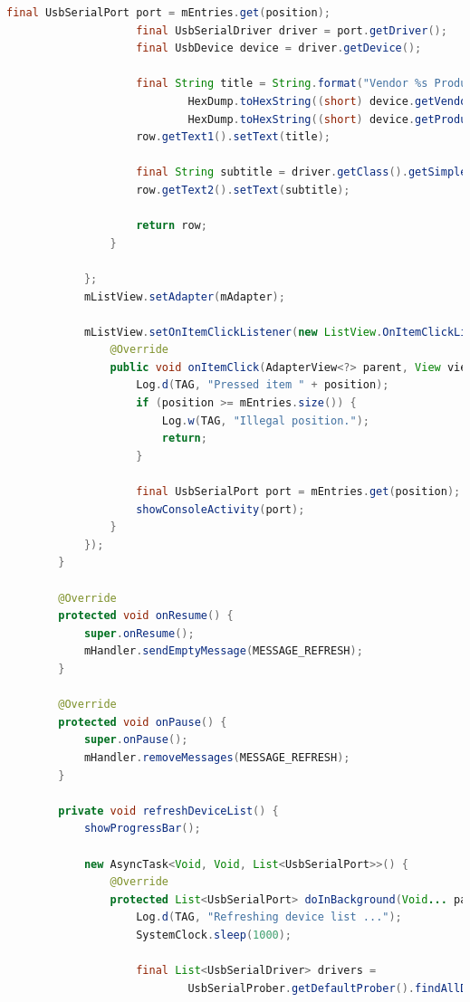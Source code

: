 \documentclass{article}
\numberwithin{figure}{section}
\numberwithin{equation}{section}
\begin{document}
{\begin{lstlisting}[language=Java,label=lst:devicelist,caption=DeviceListActivity.java]
                    final UsbSerialPort port = mEntries.get(position);
                    final UsbSerialDriver driver = port.getDriver();
                    final UsbDevice device = driver.getDevice();

                    final String title = String.format("Vendor %s Product %s",
                            HexDump.toHexString((short) device.getVendorId()),
                            HexDump.toHexString((short) device.getProductId()));
                    row.getText1().setText(title);

                    final String subtitle = driver.getClass().getSimpleName();
                    row.getText2().setText(subtitle);

                    return row;
                }

            };
            mListView.setAdapter(mAdapter);

            mListView.setOnItemClickListener(new ListView.OnItemClickListener() {
                @Override
                public void onItemClick(AdapterView<?> parent, View view, int position, long id) {
                    Log.d(TAG, "Pressed item " + position);
                    if (position >= mEntries.size()) {
                        Log.w(TAG, "Illegal position.");
                        return;
                    }

                    final UsbSerialPort port = mEntries.get(position);
                    showConsoleActivity(port);
                }
            });
        }

        @Override
        protected void onResume() {
            super.onResume();
            mHandler.sendEmptyMessage(MESSAGE_REFRESH);
        }

        @Override
        protected void onPause() {
            super.onPause();
            mHandler.removeMessages(MESSAGE_REFRESH);
        }

        private void refreshDeviceList() {
            showProgressBar();

            new AsyncTask<Void, Void, List<UsbSerialPort>>() {
                @Override
                protected List<UsbSerialPort> doInBackground(Void... params) {
                    Log.d(TAG, "Refreshing device list ...");
                    SystemClock.sleep(1000);

                    final List<UsbSerialDriver> drivers =
                            UsbSerialProber.getDefaultProber().findAllDrivers(mUsbManager);


\end{lstlisting}}
\end{document}
